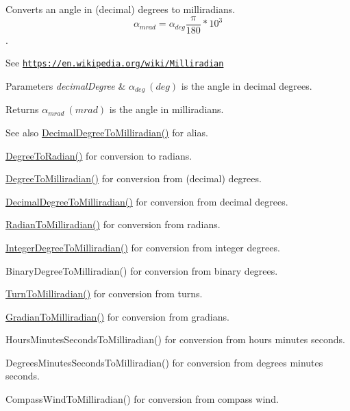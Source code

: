 Converts an angle in (decimal) degrees to milliradians. \[\alpha_{mrad}=\alpha_{deg}\frac{\pi}{180}*10^3\]. 

See \href{https://en.wikipedia.org/wiki/Milliradian}{\tt https\+://en.\+wikipedia.\+org/wiki/\+Milliradian} 
\begin{DoxyParams}{Parameters}
{\em decimal\+Degree} & $\alpha_{deg}\ (deg)$ is the angle in decimal degrees. \\
\hline
\end{DoxyParams}
\begin{DoxyReturn}{Returns}
$\alpha_{mrad}\ (mrad)$ is the angle in milliradians. 
\end{DoxyReturn}
\begin{DoxySeeAlso}{See also}
\mbox{\hyperlink{group___e_g_x_math-_angle_conversions-_decimal_degree_gab567d02d4692d9642a4ad219e479713a}{Decimal\+Degree\+To\+Milliradian()}} for alias. 

\mbox{\hyperlink{group___e_g_x_math-_angle_conversions-_degree_ga48585541b228c852c9d08a9eac3682f0}{Degree\+To\+Radian()}} for conversion to radians. 

\mbox{\hyperlink{group___e_g_x_math-_angle_conversions-_degree_gae4fa6c2d3805430760783650cfbfdb11}{Degree\+To\+Milliradian()}} for conversion from (decimal) degrees. 

\mbox{\hyperlink{group___e_g_x_math-_angle_conversions-_decimal_degree_gab567d02d4692d9642a4ad219e479713a}{Decimal\+Degree\+To\+Milliradian()}} for conversion from decimal degrees. 

\mbox{\hyperlink{group___e_g_x_math-_angle_conversions-_radian_gaea391f0cca39b05e298dd1cae162e7f1}{Radian\+To\+Milliradian()}} for conversion from radians. 

\mbox{\hyperlink{group___e_g_x_math-_angle_conversions-_integer_degree_ga5379a68bdff5cc4fab5bb1ba06ef9453}{Integer\+Degree\+To\+Milliradian()}} for conversion from integer degrees. 

Binary\+Degree\+To\+Milliradian() for conversion from binary degrees. 

\mbox{\hyperlink{group___e_g_x_math-_angle_conversions-_turn_ga2aea2621472294ce4c25ac7e55db51c6}{Turn\+To\+Milliradian()}} for conversion from turns. 

\mbox{\hyperlink{group___e_g_x_math-_angle_conversions-_gradian_ga144f1019dc760268a163d81fcb3ce482}{Gradian\+To\+Milliradian()}} for conversion from gradians. 

Hours\+Minutes\+Seconds\+To\+Milliradian() for conversion from hours minutes seconds. 

Degrees\+Minutes\+Seconds\+To\+Milliradian() for conversion from degrees minutes seconds. 

Compass\+Wind\+To\+Milliradian() for conversion from compass wind. 
\end{DoxySeeAlso}
\mbox{\label{group___e_g_x_math-_angle_conversions-_degree_ga48585541b228c852c9d08a9eac3682f0}} 
